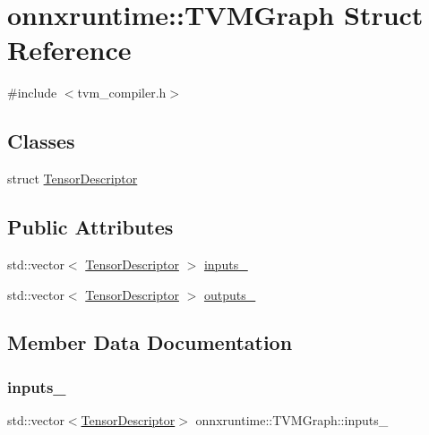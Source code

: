 \hypertarget{structonnxruntime_1_1TVMGraph}{}\section{onnxruntime\+:\+:T\+V\+M\+Graph Struct Reference}
\label{structonnxruntime_1_1TVMGraph}


{\ttfamily \#include $<$tvm\+\_\+compiler.\+h$>$}

\subsection*{Classes}
\begin{DoxyCompactItemize}
\item 
struct \mbox{\hyperlink{structonnxruntime_1_1TVMGraph_1_1TensorDescriptor}{Tensor\+Descriptor}}
\end{DoxyCompactItemize}
\subsection*{Public Attributes}
\begin{DoxyCompactItemize}
\item 
std\+::vector$<$ \mbox{\hyperlink{structonnxruntime_1_1TVMGraph_1_1TensorDescriptor}{Tensor\+Descriptor}} $>$ \mbox{\hyperlink{structonnxruntime_1_1TVMGraph_ae402bf236d33f4a57e24d6ed3e56f396}{inputs\+\_\+}}
\item 
std\+::vector$<$ \mbox{\hyperlink{structonnxruntime_1_1TVMGraph_1_1TensorDescriptor}{Tensor\+Descriptor}} $>$ \mbox{\hyperlink{structonnxruntime_1_1TVMGraph_a0e00c2efd0c8e1f53738f0b1293fe08a}{outputs\+\_\+}}
\end{DoxyCompactItemize}


\subsection{Member Data Documentation}
\mbox{\label{structonnxruntime_1_1TVMGraph_ae402bf236d33f4a57e24d6ed3e56f396}} 
\subsubsection{\texorpdfstring{inputs\+\_\+}{inputs\_}}
{\footnotesize\ttfamily std\+::vector$<$\mbox{\hyperlink{structonnxruntime_1_1TVMGraph_1_1TensorDescriptor}{Tensor\+Descriptor}}$>$ onnxruntime\+::\+T\+V\+M\+Graph\+::inputs\+\_\+}

